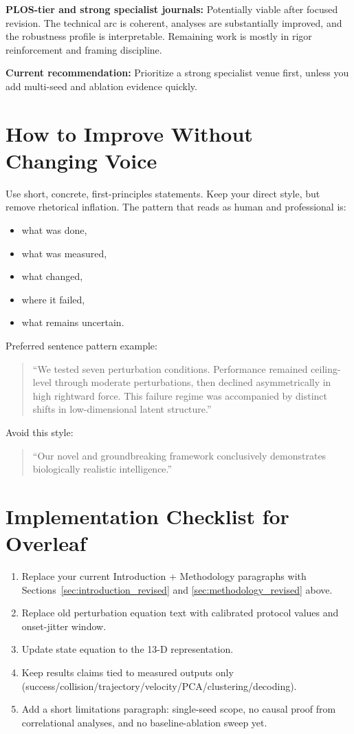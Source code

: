 \textbf{PLOS-tier and strong specialist journals:} Potentially viable after focused revision. The technical arc is coherent, analyses are substantially improved, and the robustness profile is interpretable. Remaining work is mostly in rigor reinforcement and framing discipline.

\textbf{Current recommendation:}
Prioritize a strong specialist venue first, unless you add multi-seed and ablation evidence quickly.

\section{How to Improve Without Changing Voice}
\label{sec:voice_preserving_improvements}

Use short, concrete, first-principles statements. Keep your direct style, but remove rhetorical inflation. The pattern that reads as human and professional is:
\begin{itemize}
\item what was done,
\item what was measured,
\item what changed,
\item where it failed,
\item what remains uncertain.
\end{itemize}

Preferred sentence pattern example:
\begin{quote}
``We tested seven perturbation conditions. Performance remained ceiling-level through moderate perturbations, then declined asymmetrically in high rightward force. This failure regime was accompanied by distinct shifts in low-dimensional latent structure.''
\end{quote}

Avoid this style:
\begin{quote}
``Our novel and groundbreaking framework conclusively demonstrates biologically realistic intelligence.''
\end{quote}

\section{Implementation Checklist for Overleaf}
\label{sec:implementation_checklist}

\begin{enumerate}
\item Replace your current Introduction + Methodology paragraphs with Sections~\ref{sec:introduction_revised} and \ref{sec:methodology_revised} above.
\item Replace old perturbation equation text with calibrated protocol values and onset-jitter window.
\item Update state equation to the 13-D representation.
\item Keep results claims tied to measured outputs only (success/collision/trajectory/velocity/PCA/clustering/decoding).
\item Add a short limitations paragraph: single-seed scope, no causal proof from correlational analyses, and no baseline-ablation sweep yet.
\end{enumerate}

